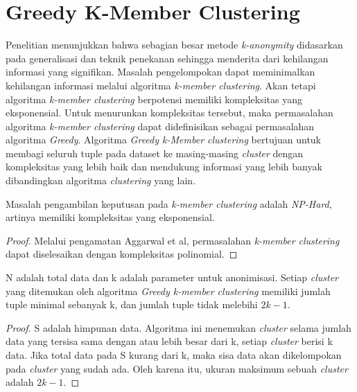 \section{Greedy K-Member Clustering}
\label{sec:greedyclustering}
Penelitian menunjukkan bahwa sebagian besar metode \textit{k-anonymity} didasarkan pada generalisasi dan teknik penekanan sehingga menderita dari kehilangan informasi yang signifikan. Masalah pengelompokan dapat meminimalkan kehilangan informasi melalui algoritma \textit{k-member clustering}. Akan tetapi algoritma \textit{k-member clustering} berpotensi memiliki kompleksitas yang eksponensial. Untuk menurunkan kompleksitas tersebut, maka permasalahan algoritma \textit{k-member clustering} dapat didefinisikan sebagai permasalahan algoritma \textit{Greedy}. Algoritma \textit{Greedy k-Member clustering} bertujuan untuk membagi seluruh tuple pada dataset ke masing-masing \textit{cluster} dengan kompleksitas yang lebih baik dan mendukung informasi yang lebih banyak dibandingkan algoritma \textit{clustering} yang lain.

\vspace{0.5cm}
\begin{theorem}
Masalah pengambilan keputusan pada \textit{k-member clustering} adalah \textit{NP-Hard}, artinya memiliki kompleksitas yang eksponensial.
\end{theorem}

\begin{proof}
Melalui pengamatan Aggarwal et al, permasalahan \textit{k-member clustering} dapat diselesaikan dengan kompleksitas polinomial.
\end{proof}

\begin{theorem}
N adalah total data dan k adalah parameter untuk anonimisasi. Setiap \textit{cluster} yang ditemukan oleh algoritma \textit{Greedy k-member clustering} memiliki jumlah tuple minimal sebanyak k, dan jumlah tuple tidak melebihi $2k - 1$.
\end{theorem}

\begin{proof}
S adalah himpunan data. Algoritma ini menemukan \textit{cluster} selama jumlah data yang tersisa sama dengan atau lebih besar dari k, setiap \textit{cluster} berisi k data. Jika total data pada S kurang dari k, maka sisa data akan dikelompokan pada  \textit{cluster} yang sudah ada. Oleh karena itu, ukuran maksimum sebuah \textit{cluster} adalah $2k - 1$.
\end{proof}

